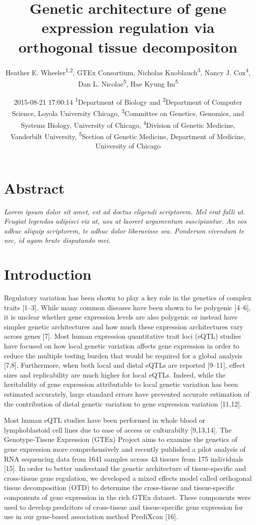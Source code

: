 \documentclass[]{article}
\title{Genetic architecture of gene expression regulation via orthogonal tissue
decompositon}
\author{Heather E. Wheeler\textsuperscript{1,2}, GTEx Consortium, Nicholas
Knoblauch\textsuperscript{3}, Nancy J. Cox\textsuperscript{4}, Dan L.
Nicolae\textsuperscript{5}, Hae Kyung Im\textsuperscript{5}}
\date{2015-08-21 17:00:14 \textsuperscript{1}Department of Biology and
\textsuperscript{2}Department of Computer Science, Loyola University
Chicago, \textsuperscript{3}Committee on Genetics, Genomics, and Systems
Biology, University of Chicago, \textsuperscript{4}Division of Genetic
Medicine, Vanderbilt University, \textsuperscript{5}Section of Genetic
Medicine, Department of Medicine, University of Chicago}
\begin{document}
\maketitle


\section{Abstract}\label{abstract}

\emph{Lorem ipsum dolor sit amet, est ad doctus eligendi scriptorem. Mel
erat falli ut. Feugiat legendos adipisci vix at, usu at laoreet
argumentum suscipiantur. An eos adhuc aliquip scriptorem, te adhuc dolor
liberavisse sea. Ponderum vivendum te nec, id agam brute disputando
mei.}

\section{Introduction}\label{introduction}

Regulatory variation has been shown to play a key role in the genetics
of complex traits {[}1--3{]}. While many common diseases have been shown
to be polygenic {[}4--6{]}, it is unclear whether gene expression levels
are also polygenic or instead have simpler genetic architectures and how
much these expression architectures vary across genes {[}7{]}. Most
human expression quantitative trait loci (eQTL) studies have focused on
how local genetic variation affects gene expression in order to reduce
the multiple testing burden that would be required for a global analysis
{[}7,8{]}. Furthermore, when both local and distal eQTLs are reported
{[}9--11{]}, effect sizes and replicability are much higher for local
eQTLs. Indeed, while the heritability of gene expression attributable to
local genetic variation has been estimated accurately, large standard
errors have prevented accurate estimation of the contribution of distal
genetic variation to gene expression variation {[}11,12{]}.

Most human eQTL studies have been performed in whole blood or
lymphoblastoid cell lines due to ease of access or culturabilty
{[}9,13,14{]}. The Genotype-Tissue Expression (GTEx) Project aims to
examine the genetics of gene expression more comprehensively and
recently published a pilot analysis of RNA sequencing data from 1641
samples across 43 tissues from 175 individuals {[}15{]}. In order to
better understand the genetic architecture of tissue-specific and
cross-tissue gene regulation, we developed a mixed effects model called
orthogonal tissue decomposition (OTD) to determine the cross-tissue and
tissue-specific components of gene expression in the rich GTEx dataset.
These components were used to develop predcitors of cross-tissue and
tissue-specific gene expression for use in our gene-based association
method PrediXcan {[}16{]}.
\end{document}
